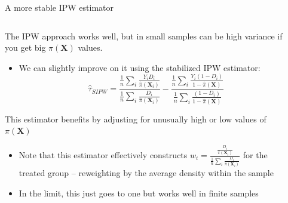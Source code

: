 \documentclass[notes,11pt, aspectratio=169]{beamer}
\newenvironment{wideitemize}{\itemize\addtolength{\itemsep}{10pt}}{\enditemize}
\begin{document}
\begin{frame}{A more stable IPW estimator}
\begin{columns}[T] %
\begin{column}{.8\textwidth}
  \begin{wideitemize}
  \item The IPW approach works well, but in small samples can be high
    variance if you get big $\pi(\mathbf{X})$ values.
    \begin{itemize}
    \item     We can slightly improve on it using the stabilized IPW estimator:
      \begin{equation*}
        \hat{\tau}_{SIPW} = \frac{\frac{1}{n}\sum_{i}\frac{Y_{i}D_{i}}{\hat{\pi}(\mathbf{X}_{i})}}{\frac{1}{n}\sum_{i}\frac{D_{i}}{\hat{\pi}(\mathbf{X}_{i})}} - \frac{\frac{1}{n}\sum_{i}\frac{Y_{i}(1-D_{i})}{1-\hat{\pi}(\mathbf{X})}}{\frac{1}{n}\sum_{i}\frac{(1-D_{i})}{1-\hat{\pi}(\mathbf{X})}}
      \end{equation*}
    \end{itemize}
  \item This estimator benefits by adjusting for unusually high or low
    values of $\pi(\mathbf{X})$
    \begin{itemize}
    \item Note that this estimator effectively constructs $w_{i} = \frac{\frac{D_{i}}{\hat{\pi}(\mathbf{X}_{i})}}{\frac{1}{n}\sum_{i}\frac{D_{i}}{\hat{\pi}(\mathbf{X}_{i})}} $ for the treated group -- reweighting by the average density within the sample
    \item In the limit, this just goes to one but works well in finite samples
    \end{itemize}
    \end{wideitemize}
\end{column}%
\hfill%
\begin{column}{.4\textwidth}

\end{column}%
\end{columns}
\end{frame}
\end{document}
